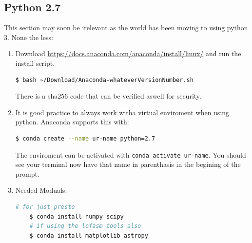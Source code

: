 \documentclass{article}
\begin{document}
\subsection{Python 2.7}
This section may soon be irelevant as the world has been moving to using python 3. None the less:
\begin{enumerate}
    \item Download \href{Anaconda 3}{https://docs.anaconda.com/anaconda/install/linux/} and run the install script. \begin{lstlisting}[language=bash]
$ bash ~/Download/Anaconda-whateverVersionNumber.sh
\end{lstlisting}
There is a sha256 code that can be verified aswell for security. 
    \item It is good practice to always work witha virtual enviroment when using python. Anaconda supports this with: \begin{lstlisting}[language=bash] 
$ conda create --name ur-name python=2.7
\end{lstlisting} 
The enviroment can be activated with \texttt{conda activate ur-name}. You should see your terminal now have that name in parenthasis in the begining of the prompt.
    \item Needed Moduals: \begin{lstlisting}[language=bash]
    # for just presto
    $ conda install numpy scipy
    # if using the lofasm tools also
    $ conda install matplotlib astropy
    \end{lstlisting}
\end{enumerate}
\end{document}
